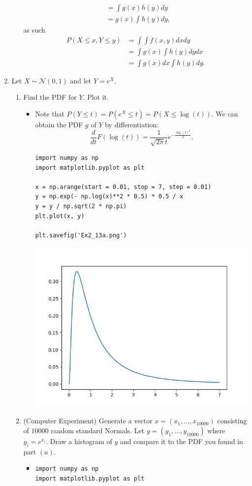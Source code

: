 \documentclass{article}
\begin{document}
\begin{enumerate}
\begin{itemize}
$$\begin{aligned}
			&= \int g(x) h(y) dy \\
			&= g(x) \int h(y) dy,
			\end{aligned}
			$$
			as such
			$$
			\begin{aligned}
			P(X \leq x, Y \leq y) &= \int \int f(x, y) dx dy \\
			&= \int g(x) \int h(y) dy dx \\
			&= \int g(x) dx \int h(y) dy.
			\end{aligned}
			$$
		\end{itemize}
	\item Let $X \sim \mathcal{N}(0, 1)$ and let $Y = e^X$.
		\begin{enumerate}
			\item Find the PDF for $Y$. Plot it.
				\begin{itemize}
					\item Note that $P(Y \leq t) = P(e^X \leq t) = P(X \leq \log(t))$. We can obtain the PDF $g$ of $Y$ by differentiation:
					$$
					\frac{d}{dt} F(\log(t)) = \frac{1}{\sqrt{2\pi} t} e^{- \frac{\log(t)^2}{2}}.
					$$
					\begin{verbatim}
import numpy as np
import matplotlib.pyplot as plt

x = np.arange(start = 0.01, stop = 7, step = 0.01)
y = np.exp(- np.log(x)**2 * 0.5) * 0.5 / x
y = y / np.sqrt(2 * np.pi)
plt.plot(x, y)

plt.savefig('Ex2_13a.png')
					\end{verbatim}
					\begin{center}
						\includegraphics[width=\linewidth]{2-Random_Variables/Ex2_13a.png}
					\end{center}
				\end{itemize}
			\item (Computer Experiment) Generate a vector $x = (x_1, \dots, x_{10000})$ consisting of $10000$ random standard Normals. Let $y = (y_1, \dots, y_{10000})$ where $y_i = e^{x_i}$. Draw a histogram of $y$ and compare it to the PDF you found in part $(a)$.
				\begin{itemize}
					\item
					\begin{verbatim}
import numpy as np
import matplotlib.pyplot as plt


\end{verbatim}
\end{itemize}
\end{enumerate}
\end{enumerate}
\end{document}

